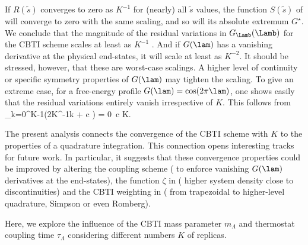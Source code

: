 If $R(\tilde{s})$ converges to zero as $K^{-1}$ for (nearly) all $\tilde{s}$ values,
the function $S(\tilde{s})$ of  will converge to zero with the same scaling, and so will its absolute extremum $G^\star$. We conclude that the magnitude  of the residual variations
in $G_{\Lamb}(\Lamb)$ for the CBTI scheme scales at least as $K^{-1}$ . And if $G(\lam)$ has a vanishing derivative at the physical end-states, it will scale at least as $K^{-2}$.
%
It should be stressed, however, that these are worst-case scalings. A higher level of continuity or specific symmetry properties of $G(\lam)$ may tighten the scaling. 
%
To give an extreme case, for a free-energy profile $G(\lam)=\cos (2\pi\lam)$,
one shows easily that the residual variations  entirely vanish irrespective of $K$. 
%
This follows from 
\sum\limits_{k=0}^{K-1}\cos \left (2\pi K^{-1}k + c \right ) = 0\quad\forall~c \quad {}K.
\eeq

The present analysis connects the convergence of the CBTI scheme with $K$ to the properties of a quadrature integration. This connection opens interesting tracks for future work. In particular, it suggests that these convergence properties could be improved by altering the coupling scheme (\eg{} to enforce vanishing $G(\lam)$ derivatives at the end-states), the function $\zeta$ in  (\eg{} higher system density close to discontinuities) and the CBTI weighting in  (\eg{} from trapezoidal to higher-level quadrature, \eg{} Simpson or even Romberg).


Here, we explore the influence of the CBTI 
mass parameter $m_\Lambda$ and thermostat coupling 
time $\tau_\Lambda$ considering different numbers $K$ 
of replicas. 
%

